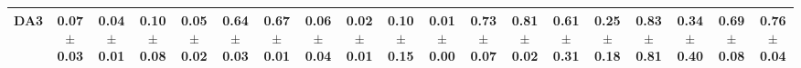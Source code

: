 \begin{table}[ht]
{\begin{tabular}{l *{3}{cc} *{3}{cc} *{3}{cc}}
DA3
& \makecell{0.07 \\ {\tiny $\pm$ 0.03}} & \makecell{\textbf{0.04} \\ {\tiny $\pm$ 0.01}} 
& \makecell{0.10 \\ {\tiny $\pm$ 0.08}} & \makecell{\textbf{0.05} \\ {\tiny $\pm$ 0.02}} 
& \makecell{0.64 \\ {\tiny $\pm$ 0.03}} & \makecell{\textbf{0.67} \\ {\tiny $\pm$ 0.01}} 
& \makecell{0.06 \\ {\tiny $\pm$ 0.04}} & \makecell{\textbf{0.02} \\ {\tiny $\pm$ 0.01}} 
& \makecell{0.10 \\ {\tiny $\pm$ 0.15}} & \makecell{\textbf{0.01} \\ {\tiny $\pm$ 0.00}} 
& \makecell{0.73 \\ {\tiny $\pm$ 0.07}} & \makecell{\textbf{0.81} \\ {\tiny $\pm$ 0.02}} 
& \makecell{0.61 \\ {\tiny $\pm$ 0.31}} & \makecell{\textbf{0.25} \\ {\tiny $\pm$ 0.18}} 
& \makecell{0.83 \\ {\tiny $\pm$ 0.81}} & \makecell{\textbf{0.34} \\ {\tiny $\pm$ 0.40}} 
& \makecell{0.69 \\ {\tiny $\pm$ 0.08}} & \makecell{\textbf{0.76} \\ {\tiny $\pm$ 0.04}} \\

\bottomrule
\end{tabular}


}
\vspace{-2mm}
\end{table}